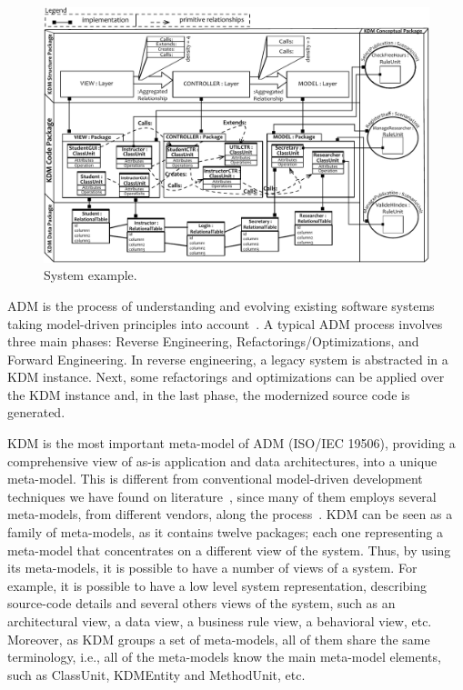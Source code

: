 
 
\begin{figure}[t]
	\centering
	\includegraphics[scale=0.78]{figuras/NovoSystem5Preto}
	\caption{System example.}
	\label{fig:system}
\end{figure}

ADM is the process of understanding  and evolving existing software systems taking model-driven principles into account~\cite{1686216}. A typical ADM process involves three main phases: Reverse Engineering, Refactorings/Optimizations, and Forward Engineering. In reverse engineering, a legacy system is abstracted in a KDM instance. Next, some refactorings and optimizations can be applied over the KDM instance and, in the last phase, the modernized source code is generated. 

KDM is the most important meta-model of ADM (ISO/IEC 19506), providing a comprehensive view of as-is application and data architectures, into a unique meta-model. This is different from conventional model-driven development techniques we have found on literature~\cite{7051941}, since many of them employs several meta-models, from different vendors, along the process~\cite{Perez-Castillo:2011:KDM}. KDM can be seen as a family of meta-models, as it contains twelve packages; each one representing a meta-model that concentrates on a different view of the system. Thus, by using its  meta-models, it is possible to have a number of views of a system. For example, it is possible to have a low level system representation, describing source-code details and several others views of the system, such as an architectural view, a data view, a business rule view, a behavioral view, etc. Moreover, as KDM groups a set of meta-models, all of them share the same terminology, i.e., all of the meta-models know the main meta-model elements, such as ClassUnit, KDMEntity and MethodUnit, etc.

